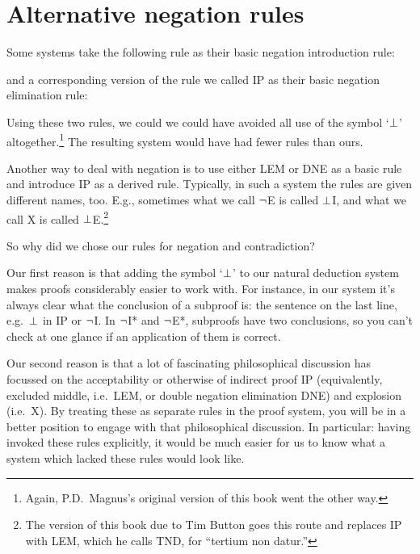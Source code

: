 \section{Alternative negation rules}
Some systems take the following rule as their basic negation introduction rule:
\begin{fitchproof}
	\open
	\close
\end{fitchproof}
and a corresponding version of the rule we called IP as their basic negation elimination rule:
\begin{fitchproof}
	\open
	\close
\end{fitchproof}
Using these two rules, we could we could have avoided all use of the symbol `$\bot$' altogether.\footnote{Again, P.D.\ Magnus's original version of this book went the other way.} The resulting system would have had fewer rules than ours.

Another way to deal with negation is to use either LEM or DNE as a basic rule and introduce IP as a derived rule. Typically, in such a system the rules are given different names, too. E.g., sometimes what we call $\neg$E is called $\bot$I, and what we call X is called $\bot$E.\footnote{The version of this book due to Tim Button goes this route and replaces IP with LEM, which he calls TND, for ``tertium non datur.''}

So why did we chose our rules for negation and contradiction? 

Our first reason is that adding the symbol `$\bot$' to our natural deduction system makes proofs considerably easier to work with. For instance, in our system it's always clear what the conclusion of a subproof is: the sentence on the last line, e.g.\ $\bot$ in IP or $\neg$I. In $\neg$I* and $\neg$E*, subproofs have two conclusions, so you can't check at one glance if an application of them is correct. 

Our second reason is that a lot of fascinating philosophical discussion has focussed on the acceptability or otherwise of indirect proof IP (equivalently, excluded middle, i.e.\ LEM, or double negation elimination DNE) and explosion (i.e.\ X). By treating these as separate rules in the proof system, you will be  in a better position to engage with that philosophical discussion. In particular: having invoked these rules explicitly, it would be much easier for us to know what a system which lacked these rules would look like.

